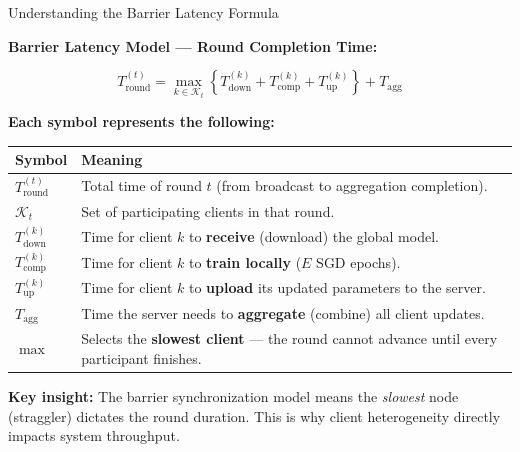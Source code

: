 \documentclass[aspectratio=169]{beamer}
\begin{document}
\begin{frame}{Understanding the Barrier Latency Formula}
    \begin{center}
        \textbf{Barrier Latency Model --- Round Completion Time:}
        \vspace{0.3cm}

        \[
        T_{\text{round}}^{(t)}
        =
        \max_{k\in \mathcal{K}_t}
        \left\{
        T_{\text{down}}^{(k)}
        +T_{\text{comp}}^{(k)}
        +T_{\text{up}}^{(k)}
        \right\}
        +T_{\text{agg}}
        \]
    \end{center}
    \vspace{0.2cm}
    \textbf{Each symbol represents the following:}
    \vspace{0.15cm}

    \begin{center}
    \footnotesize
    \renewcommand{\arraystretch}{1.35}
    \begin{tabular}{@{} >{\centering\arraybackslash}p{3.2cm} p{9.5cm} @{}}
        \toprule
        \textbf{Symbol} & \textbf{Meaning} \\
        \midrule
        $T_{\text{round}}^{(t)}$   & Total time of round $t$ (from broadcast to aggregation completion). \\
        $\mathcal{K}_t$            & Set of participating clients in that round. \\
        $T_{\text{down}}^{(k)}$    & Time for client $k$ to \textbf{receive} (download) the global model. \\
        $T_{\text{comp}}^{(k)}$    & Time for client $k$ to \textbf{train locally} ($E$ SGD epochs). \\
        $T_{\text{up}}^{(k)}$      & Time for client $k$ to \textbf{upload} its updated parameters to the server. \\
        $T_{\text{agg}}$           & Time the server needs to \textbf{aggregate} (combine) all client updates. \\
        $\max$                     & Selects the \textbf{slowest client} --- the round cannot advance until every participant finishes. \\
        \bottomrule
    \end{tabular}
    \end{center}
    \vspace{0.15cm}
    \footnotesize \textbf{Key insight:} The barrier synchronization model means the \textit{slowest} node (straggler) dictates the round duration. This is why client heterogeneity directly impacts system throughput.
\end{frame}
\end{document}

